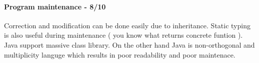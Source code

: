 \documentclass[5pt]{article}
\begin{document}
\paragraph{Program maintenance - 8/10}
Correction and modification can be done easily due to inheritance. Static typing
is also useful during maintenance ( you know what returns concrete funtion ).
Java support massive class library. On the other hand Java is non-orthogonal and multiplicity languge which results in poor readability and poor maintenace.
\end{document}
